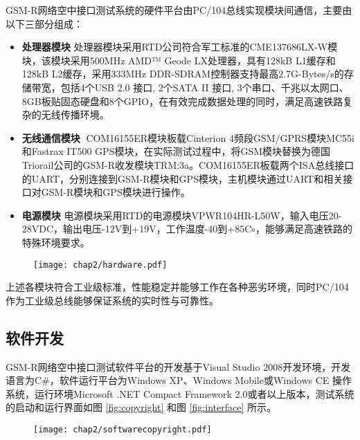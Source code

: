 GSM-R网络空中接口测试系统的硬件平台由PC/104总线实现模块间通信，主要由以下三部分组成：
\begin{itemize}
  \item \textbf{处理器模块}
  处理器模块采用RTD公司符合军工标准的CME137686LX-W模块，该模块采用500MHz AMD™ Geode LX处理器，具有128kB L1缓存和128kB L2缓存，采用333MHz DDR-SDRAM控制器支持最高2.7G-Bytes/s的存储带宽，包括4个USB 2.0 接口, 2个SATA II 接口, 3个串口、千兆以太网口、8GB板贴固态硬盘和8个GPIO，在有效完成数据处理的同时，满足高速铁路复杂的无线传播环境。
  \item \textbf{无线通信模块}
  COM16155ER模块板载Cinterion 4频段GSM/GPRS模块MC55i和Fastrax IT500 GPS模块，在实际测试过程中，将GSM模块替换为德国Triorail公司的GSM-R收发模块TRM:3a。COM16155ER板载两个ISA总线接口的UART，分别连接到GSM-R模块和GPS模块，主机模块通过UART和相关接口对GSM-R模块和GPS模块进行操作。
  \item\textbf{电源模块}
  电源模块采用RTD的电源模块VPWR104HR-L50W，输入电压20-28VDC，输出电压-12V到+19V，工作温度-40到+85C$\circ$，能够满足高速铁路的特殊环境要求。
\end{itemize}

\begin{figure}[!htp]
\centering
    \texttt{[image: chap2/hardware.pdf]}
\end{figure}

上述各模块符合工业级标准，性能稳定并能够工作在各种恶劣环境，同时PC/104作为工业级总线能够保证系统的实时性与可靠性。

\subsection{软件开发}
\label{sec:softwaregsmmr}

GSM-R网络空中接口测试软件平台的开发基于Visual Studio 2008开发环境，开发语言为C\#，软件运行平台为Windows XP、Windows Mobile或Windows CE 操作系统，运行环境Microsoft .NET Compact Framework 2.0或者以上版本，测试系统的启动和运行界面如图 \ref{fig:copyright} 和图 \ref{fig:interface} 所示。

\begin{figure}[!htp]
\centering
    \texttt{[image: chap2/softwarecopyright.pdf]}
\end{figure}

